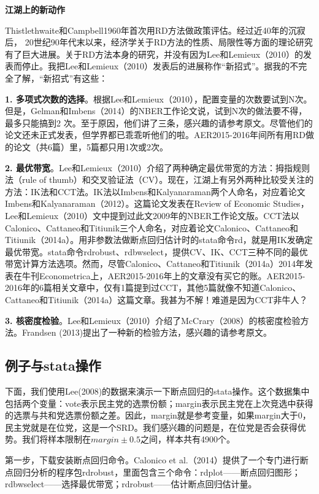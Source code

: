 \documentclass[cn,12pt,math=newtx,citestyle=gb7714-2015,bibstyle=gb7714-2015]{elegantbook}
\begin{document}
	\textbf{江湖上的新动作}
	
	Thistlethwaite和Campbell1960年首次用RD方法做政策评估。经过近40年的沉寂后， 20世纪90年代末以来，经济学关于RD方法的性质、局限性等方面的理论研究有了巨大进展。关于RD方法本身的研究，并没有因为Lee和Lemieux（2010）的发表而停止。我把Lee和Lemieux（2010）发表后的进展称作“新招式”。据我的不完全了解，“新招式”有这些：
	
	\textbf{1. 多项式次数的选择}。根据Lee和Lemieux（2010），配置变量的次数要试到N次。但是，Gelman和Imbens（2014）的NBER工作论文说，试到N次的做法要不得，最多只能搞到2 次。至于原因，他们讲了三条，感兴趣的请参考原文。尽管他们的论文还未正式发表，但学界都已乖乖听他们的啦。AER2015-2016年间所有用RD做的论文（共6篇）里，5篇都只用1次或2次。
	
	\textbf{2. 最优带宽}。Lee和Lemieux（2010）介绍了两种确定最优带宽的方法：拇指规则法（rule of thumb）和交叉验证法（CV）。现在，江湖上有另外两种比较受关注的方法：IK法和CCT法。IK法以Imbens和Kalyanaraman两个人命名，对应着论文Imbens和Kalyanaraman（2012）。这篇论文发表在Review of Economic Studies，Lee和Lemieux（2010）文中提到过此文2009年的NBER工作论文版。CCT法以Calonico、Cattaneo和Titiunik三个人命名，对应着论文Calonico、Cattaneo和Titiunik（2014a）。用非参数法做断点回归估计时的stata命令rd，就是用IK发确定最优带宽。stata命令rdrobust、rdbwselect，提供CV、IK、CCT三种不同的最优带宽计算方法选项。然而，尽管Calonico、Cattaneo和Titiunik（2014a）2014年发表在牛刊Econometrica上，AER2015-2016年上的文章没有买它的账。AER2015-2016年的6篇相关文章中，仅有1篇提到过CCT，其他5篇就像不知道Calonico、Cattaneo和Titiunik（2014a）这篇文章。我甚为不解！难道是因为CCT非牛人？
	
	\textbf{3. 核密度检验}。Lee和Lemieux（2010）介绍了McCrary（2008）的核密度检验方法。Frandsen (2013)提出了一种新的检验方法，感兴趣的请参考原文。
	
	\subsection{例子与stata操作}
	
	下面，我们使用Lee(2008)的数据来演示一下断点回归的stata操作。这个数据集中包括两个变量：vote表示民主党的选票份额；margin表示民主党在上次竞选中获得的选票与共和党选票份额之差。因此，margin就是参考变量，如果margin大于0，民主党就是在位党，这是一个SRD。我们感兴趣的问题是，在位党是否会获得优势。我们将样本限制在$margin\pm0.5$之间，样本共有4900个。
	
	第一步，下载安装断点回归命令。Calonico et al.（2014）提供了一个专门进行断点回归分析的程序包rdrobust，里面包含三个命令：rdplot——断点回归图形；rdbwselect——选择最优带宽；rdrobust——估计断点回归估计量。
	
\end{document}
